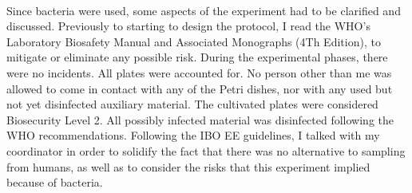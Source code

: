 \paragraph{}Since bacteria were used, some aspects of the experiment had to be clarified and discussed. Previously to starting to design the protocol, I read the WHO's Laboratory Biosafety Manual and Associated Monographs (4Th Edition)\cite{worldhealthorganizationLaboratoryBiosafetyManual2020}, to mitigate or eliminate any possible risk. During the experimental phases, there were no incidents. All plates were accounted for. No person other than me was allowed to come in contact with any of the Petri dishes, nor with any used but not yet disinfected auxiliary material. The cultivated plates were considered Biosecurity Level 2. All possibly infected material was disinfected following the WHO recommendations. Following the IBO EE guidelines, I talked with my coordinator in order to solidify the fact that there was no alternative to sampling from humans, as well as to consider the risks that this experiment implied because of bacteria.
